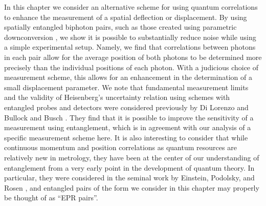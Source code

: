 In this chapter we consider an alternative scheme for using quantum correlations to enhance the measurement of a spatial deflection or displacement.  
By using spatially entangled biphoton pairs, such as those created using parametric downconversion \cite{Schneeloch2015,Law2004,Fedorov2009}, we show it is possible to substantially reduce noise while using a simple experimental setup.
Namely, we find that correlations between photons in each pair allow for the average position of both photons to be determined more precisely than the individual positions of each photon.
With a judicious choice of measurement scheme, this allows for an enhancement in the determination of a small displacement parameter.
We note that fundamental measurement limits and the validity of Heisenberg's uncertainty relation using schemes with entangled probes and detectors were considered previously by Di Lorenzo \cite{DiLorenzo2013} and Bullock and Busch \cite{Bullock2014}.
They find that it is possible to improve the sensitivity of a measurement using entanglement, which is in agreement with our analysis of a specific measurement scheme here.  
It is also interesting to consider that while continuous momentum and position correlations as quantum resources are relatively new in metrology, they have been at the center of our understanding of entanglement from a very early point in the development of quantum theory.
In particular, they were considered in the seminal work by Einstein, Podolsky, and Rosen \cite{Einstein1935}, and entangled pairs of the form we consider in this chapter may properly be thought of as ``EPR pairs''.



